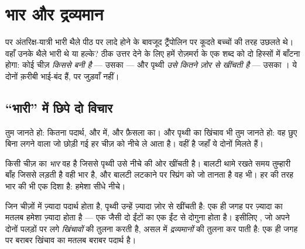 \chapter{भार और द्रव्यमान}\label{ch:g4:weight-and-mass}

 पर अंतरिक्ष-यात्री भारी थैले पीठ पर लादे होने के बावजूद
ट्रैंपोलिन पर कूदते बच्चों की तरह उछलते थे। वहाँ उनके थैले भारी थे या
हल्के? ठीक उत्तर देने के लिए हमें रोज़मर्रा के एक शब्द को दो हिस्सों
में बाँटना होगा: कोई चीज़ \emph{किससे बनी है} --- उसका  ---
और पृथ्वी \emph{उसे कितने ज़ोर से खींचती है} --- उसका । ये दोनों
क़रीबी भाई-बंद हैं, पर जुड़वाँ नहीं।

\section{``भारी'' में छिपे दो विचार}

 तुम जानते हो: कितना पदार्थ,  और  में, और
फ़ैसला  का। और पृथ्वी का खिंचाव भी तुम जानते हो: वह छुए बिना लगने
वाला  जो छोड़ी गई हर चीज़ को नीचे ले आता है।  वहीं है जहाँ ये
दोनों मिलते हैं।

\begin{definition}[भार]\label{def:g4:weight-and-mass:weight}
किसी चीज़ का \emph{भार} वह  है जिससे पृथ्वी उसे नीचे की
ओर खींचती है। बालटी थामे रखते समय तुम्हारी बाँह जिससे लड़ती है वही
भार है, और बालटी लटकाने पर स्प्रिंग को जो तानता है वह भी। हर  की
तरह भार की भी एक दिशा है: हमेशा सीधे नीचे।
\end{definition}

\begin{proposition}[ज़्यादा पदार्थ, ज़्यादा तेज़ खिंचाव]\label{prop:g4:weight-and-mass:morestuff}
जिन चीज़ों में ज़्यादा पदार्थ होता है, पृथ्वी उन्हें ज़्यादा ज़ोर से
खींचती है: एक ही जगह पर ज़्यादा  का मतलब हमेशा ज़्यादा 
होता है --- एक जैसी दो ईंटों का  एक ईंट से दोगुना होता है। इसीलिए
, जो अपने दोनों पलड़ों पर लगे \emph{खिंचावों} की तुलना करती है,
असल में \emph{द्रव्यमानों} की तुलना कर पाती है: एक ही जगह पर बराबर
खिंचाव का मतलब बराबर पदार्थ है।
\end{proposition}

